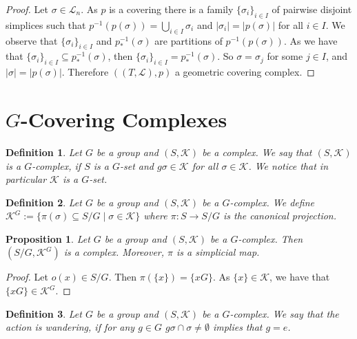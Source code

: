 \documentclass{amsart}
\newtheorem{proposition}{Proposition}[section]
\newtheorem{definition}{Definition}[section]
\begin{document}
\begin{proof}
Let $\sigma\in\mathcal{L}_n$.  As $p$ is a covering there is a family $\{\sigma_i\}_{i\in I}$ of pairwise disjoint simplices such that $p^{-1}(p(\sigma))=\bigcup_{i\in I}\sigma_i$ and $\vert \sigma_i\vert=\vert p(\sigma)\vert$ for all $i\in I$.  We observe that $ \{\sigma_i\}_{i\in I}$ and $p^{-1}_*(\sigma)$ are partitions of $p^{-1}(p(\sigma))$. As we have that $\{\sigma_i\}_{i\in I}\subseteq p^{-1}_*(\sigma)$, then $\{\sigma_i\}_{i\in I}= p^{-1}_*(\sigma)$. So $\sigma=\sigma_j$ for some $j\in I$, and $\vert\sigma\vert=\vert p(\sigma)\vert$. Therefore $((T,\mathcal{L}),p)$ a geometric covering complex.
\end{proof}

\section{$G$-Covering Complexes}

\begin{definition}
Let $G$ be a group and $(S,\mathcal{K})$ be a complex. We say that $(S,\mathcal{K})$ is a $G$-complex, if $S$ is a $G$-set and $g\sigma\in  \mathcal{K}$ for all $\sigma\in\mathcal{K}$. We notice that in particular $\mathcal{K}$ is a $G$-set.
\end{definition}

\begin{definition}
Let $G$ be a group and $(S,\mathcal{K})$ be a $G$-complex. We define $\mathcal{K}^G:=\{\pi(\sigma)\subseteq S/G\mid \sigma\in\mathcal{K}\}$ where $\pi\colon S\longrightarrow S/G$ is the canonical projection.
\end{definition}

\begin{proposition}
Let $G$ be a group and $(S,\mathcal{K})$ be a $G$-complex. Then $(S/G,\mathcal{K}^G)$ is a complex. Moreover, $\pi$ is a simplicial map.
\end{proposition}

\begin{proof}
Let $o(x)\in S/G$. Then $\pi(\{x\})=\{xG\}$. As $\{x\}\in\mathcal{K}$, we have that $\{xG\}\in\mathcal{K}^G$.
\end{proof}

\begin{definition}
Let $G$ be a group and $(S,\mathcal{K})$ be a $G$-complex. We say that the action is wandering, if for any $g\in G$ $g\sigma\cap\sigma\neq\emptyset$ implies that $g=e$. %
\end{definition}
\end{document}
